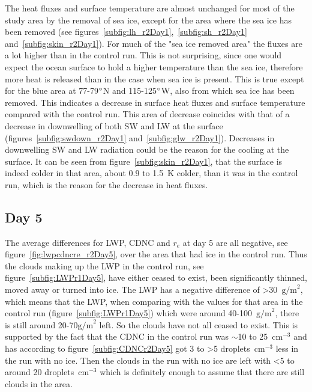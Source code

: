The heat fluxes and surface temperature are almost unchanged for most of the study area by the removal of sea ice, except for the area where the sea ice has been removed (see figures~\ref{subfig:lh_r2Day1},~\ref{subfig:sh_r2Day1} and~\ref{subfig:skin_r2Day1}). For much of the "sea ice removed area" the fluxes are a lot higher than in the control run. This is not surprising, since one would expect the ocean surface to hold a higher temperature than the sea ice, therefore more heat is released than in the case when sea ice is present. This is true except for the blue area at 77-79$\degree$N and 115-125$\degree$W, also from which sea ice has been removed. This indicates a decrease in surface heat fluxes and surface temperature compared with the control run. This area of decrease coincides with that of a decrease in downwelling of both SW and LW at the surface (figures~\ref{subfig:swdown_r2Day1} and~\ref{subfig:glw_r2Day1}). Decreases in downwelling SW and LW radiation could be the reason for the cooling at the surface. It can be seen from figure~\ref{subfig:skin_r2Day1}, that the surface is indeed colder in that area, about 0.9 to 1.5~K colder, than it was in the control run, which is the reason for the decrease in heat fluxes. 

\clearpage
\subsection{Day 5}
The average differences for LWP, CDNC and $r_e$ at day 5 are all negative, see figure~\ref{fig:lwpcdncre_r2Day5}, over the area that had ice in the control run. Thus the clouds making up the LWP in the control run, see figure~\ref{subfig:LWPr1Day5}, have either ceased to exist, been significantly thinned, moved away or turned into ice. The LWP has a negative difference of >30~$\text{g/m}^2$, which means that the LWP, when comparing with the values for that area in the control run (figure~\ref{subfig:LWPr1Day5}) which were around 40-100~$\text{g/m}^2$, there is still around 20-70$\text{g/m}^2$ left. So the clouds have not all ceased to exist. This is supported by the fact that the CDNC in the control run was $\sim$10 to 25~$\text{cm}^{-3}$ and has according to figure~\ref{subfig:CDNCr2Day5} got 3 to >5 droplets~$\text{cm}^{-3}$ less in the run with no ice. Then the clouds in the run with no ice are left with <5 to around 20 droplets~$\text{cm}^{-3}$ which is definitely enough to assume that there are still clouds in the area.

